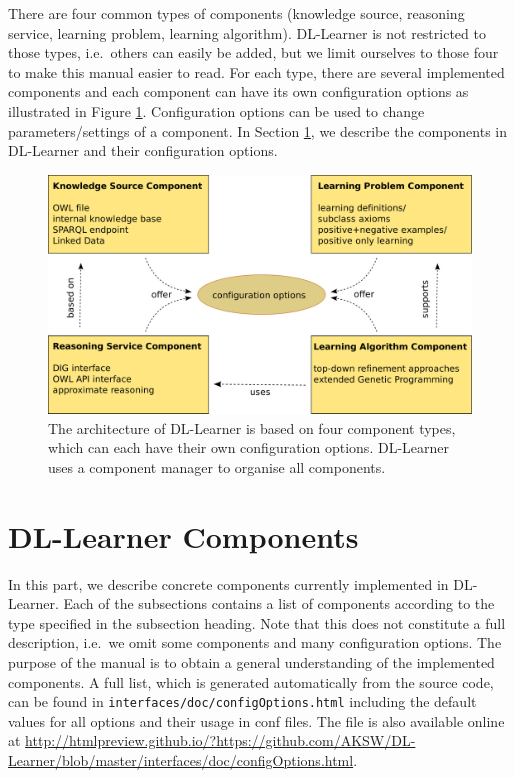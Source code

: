 \documentclass[a4paper,12pt]{scrartcl}
\begin{document}
There are four common types of components (knowledge source, reasoning service, learning problem, learning algorithm). DL-Learner is not restricted to those types, i.e.~others can easily be added, but we limit ourselves to those four to make this manual easier to read. For each type, there are several implemented components and each component can have its own configuration options as illustrated in Figure \ref{fig:components}. Configuration options can be used to change parameters/settings of a component. In Section \ref{sec:components}, we describe the components in DL-Learner and their configuration options.

\begin{figure}
 \includegraphics[width=\textwidth]{components_print}
 \caption{The architecture of DL-Learner is based on four component types, which can each have their own configuration options. DL-Learner uses a component manager to organise all components.}
 \label{fig:components}
\end{figure}

\section{DL-Learner Components}
\label{sec:components}

In this part, we describe concrete components currently implemented in DL-Learner. Each of the subsections contains a list of components according to the type specified in the subsection heading. Note that this does not constitute a full description, i.e.~we omit some components and many configuration options. The purpose of the manual is to obtain a general understanding of the implemented components. A full list, which is generated automatically from the source code, can be found in \verb|interfaces/doc/configOptions.html| including the default values for all options and their usage in conf files. The file is also available online at \url{http://htmlpreview.github.io/?https://github.com/AKSW/DL-Learner/blob/master/interfaces/doc/configOptions.html}.
\end{document}
